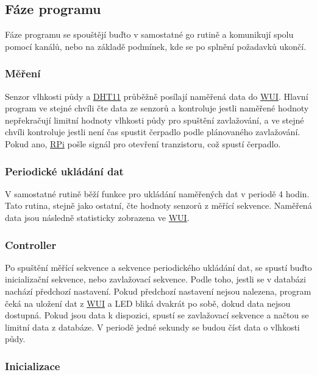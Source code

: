 \documentclass[czech,12pt,a4paper]{article}
\begin{document}
\subsection{Fáze programu}

Fáze programu se spouštějí buďto v samostatné go rutině a komunikují spolu pomocí kanálů, nebo na základě podmínek, kde se po splnění požadavků ukončí.

\subsubsection{Měření}

Senzor vlhkosti půdy a \underline{\ac{DHT11}} průběžně posílají naměřená data do \underline{\ac{WUI}}. Hlavní program ve stejné chvíli čte data ze senzorů a kontroluje jestli naměřené hodnoty nepřekračují limitní hodnoty vlhkosti půdy pro spuštění zavlažování, a ve stejné chvíli kontroluje jestli není čas spustit čerpadlo podle plánovaného zavlažování. Pokud ano, \underline{\ac{RPi}} pošle signál pro otevření tranzistoru, což spustí čerpadlo.

\subsubsection{Periodické ukládání dat}

V samostatné rutině běží funkce pro ukládání naměřených dat v periodě 4 hodin. Tato rutina, stejně jako ostatní, čte hodnoty senzorů z měřící sekvence. Naměřená data jsou následně statisticky zobrazena ve \underline{\ac{WUI}}.

\subsubsection{Controller}

Po spuštění měřící sekvence a sekvence periodického ukládání dat, se spustí buďto inicializační sekvence, nebo zavlažovací sekvence. Podle toho, jestli se v databázi nachází předchozí nastavení. Pokud předchozí nastavení nejsou nalezena, program čeká na uložení dat z \space \underline{\ac{WUI}} a \ac{LED} bliká dvakrát po sobě, dokud data nejsou dostupná. Pokud jsou data k dispozici, spustí se zavlažovací sekvence a načtou se limitní data z databáze. V periodě jedné sekundy se budou číst data o vlhkosti půdy.

\subsubsection{Inicializace}
\end{document}
